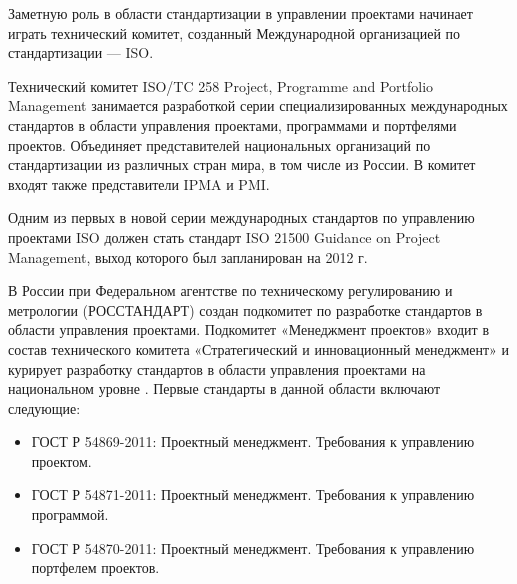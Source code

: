 Заметную роль в области стандартизации в управлении проектами начинает играть технический комитет, созданный Международной организацией по стандартизации --- ISO.

Технический комитет ISO/TC 258 Project, Programme and Portfolio Management занимается разработкой серии специализированных международных стандартов в области управления проектами, программами и портфелями проектов.
Объединяет представителей национальных организаций по стандартизации из различных стран мира, в том числе из России.
В комитет входят также представители IPMA и PMI.

Одним из первых в новой серии международных стандартов по управлению проектами ISO должен стать стандарт ISO 21500 Guidance on Project Management, выход которого был запланирован на 2012 г.

В России при Федеральном агентстве по техническому регулированию и метрологии (РОССТАНДАРТ) создан подкомитет по разработке стандартов в области управления проектами.
Подкомитет «Менеджмент проектов» входит в состав технического комитета «Стратегический и инновационный менеджмент» и курирует разработку стандартов в области управления проектами на национальном уровне \cite[37]{aleshin}.
Первые стандарты в данной области включают следующие:
\begin{itemize}
	\item ГОСТ Р 54869-2011: Проектный менеджмент. Требования к управлению проектом.
	\item ГОСТ Р 54871-2011: Проектный менеджмент. Требования к управлению программой.
	\item ГОСТ Р 54870-2011: Проектный менеджмент. Требования к управлению портфелем проектов.
\end{itemize}



